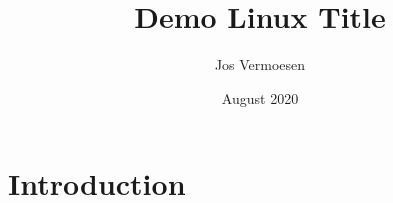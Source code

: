 \documentclass{article}
\title{Demo Linux Title}
\author{Jos Vermoesen }
\date{August 2020}
\begin{document}
\maketitle

\section{Introduction}
\end{document}
